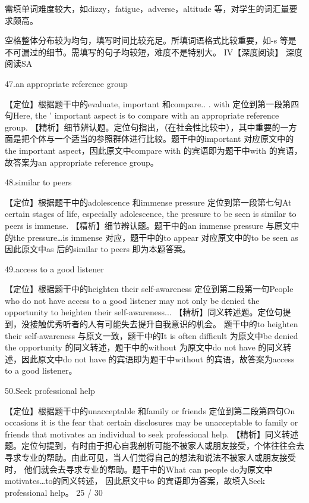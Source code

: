 \documentclass[UTF8,11pt]{ctexart}
\begin{document}
需填单词难度较大，如dizzy，fatigue，adverse，altitude 等，对学生的词汇量要求颇高。


空格整体分布较为均匀，填写时间比较充足。所填词语格式比较重要，如-s 等是不可漏过的细节。需填写的句子均较短，难度不是特别大。 IV【深度阅读】 深度阅读SA


47.an appropriate reference group


【定位】根据题干中的evaluate, important 和compare.. . with 定位到第一段第四句Here, the ' important aspect is to compare with an appropriate reference group. 【精析】细节辨认题。定位句指出，（在社会性比较中），其中重要的一方面是把个体与一个适当的参照群体进行比较。题干中的important 对应原文中的the important aspect，因此原文中compare with 的宾语即为题干中with 的宾语，故答案为an appropriate reference group。


48.similar to peers


【定位】根据题干中的adolescence 和immense pressure 定位到第一段第七句At certain stages of life, especially adolescence, the pressure to be seen is similar to peers is immense. 【精析】细节辨认题。题干中的an immense pressure 与原文中的the pressure…is immense 对应，题干中的to appear 对应原文中的to be seen as 因此原文中as 后的similar to peers 即为本题答案。


49.access to a good listener


【定位】根据题干中的heighten their self-awareness 定位到第二段第一句People who do not have access to a good listener may not only be denied the opportunity to heighten their self-awareness... 【精析】同义转述题。定位句提到，没接触优秀听者的人有可能失去提升自我意识的机会。 题干中的to heighten their self-awareness 与原文一致，题干中的It is often difficult 为原文中be denied the opportunity 的同义转述，题干中的without 为原文中do not have 的同义转述，因此原文中do not have 的宾语即为题干中without 的宾语，故答案为access to a good listener。


50.Seek professional help


【定位】根据题干中的unacceptable 和family or friends 定位到第二段第四句On occasions it is the fear that certain disclosures may be unacceptable to family or friends that motivates an individual to seek professional help. 【精析】同义转述题。定位句提到，有时由于担心自我剖析可能不被家人或朋友接受，个体往往会去寻求专业的帮助。由此可见，当人们觉得自己的想法和说法不被家人或朋友接受时， 他们就会去寻求专业的帮助。题干中的What can people do为原文中motivates…to的同义转述， 因此原文中to 的宾语即为答案，故填入Seek professional help。 25 / 30
\end{document}
